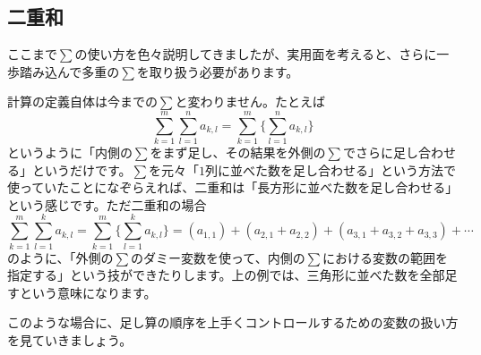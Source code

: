 \subsection{二重和}

ここまで$\sum$の使い方を色々説明してきましたが、実用面を考えると、さらに一歩踏み込んで多重の$\sum$を取り扱う必要があります。

計算の定義自体は今までの$\sum$と変わりません。たとえば
\[
\sum_{k = 1}^m \sum_{l  = 1}^n a_{k,l} = \sum_{k = 1}^m \Biggl\{\sum_{l  = 1}^n a_{k,l}\Biggr\}
\]
というように「内側の$\sum$をまず足し、その結果を外側の$\sum$でさらに足し合わせる」というだけです。$\sum$を元々「$1$列に並べた数を足し合わせる」という方法で使っていたことになぞらえれば、二重和は「長方形に並べた数を足し合わせる」という感じです。ただ二重和の場合
\[
\sum_{k = 1}^m \sum_{l  = 1}^k a_{k,l} = \sum_{k = 1}^m \Biggl\{\sum_{l  = 1}^k a_{k, l}\Biggr\} = (a_{1, 1}) + (a_{2, 1} + a_{2, 2}) + (a_{3, 1} + a_{3, 2} + a_{3, 3}) + \cdots
\]
のように、「外側の$\sum$のダミー変数を使って、内側の$\sum$における変数の範囲を指定する」という技ができたりします。上の例では、三角形に並べた数を全部足すという意味になります。

このような場合に、足し算の順序を上手くコントロールするための変数の扱い方を見ていきましょう。

